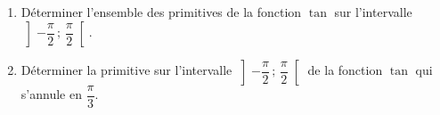 
\begin{exercice}\label{exoautoanalyseCTU-17}


 \begin{enumerate}
\item Déterminer l'ensemble des primitives de la fonction $\tan$ sur l'intervalle $\left]-\dfrac{\pi}{2}\,;\,\dfrac{\pi}{2}\right[$.
\item Déterminer la primitive  sur l'intervalle $\left]-\dfrac{\pi}{2}\,;\,\dfrac{\pi}{2}\right[$ de la fonction $\tan$ qui s'annule en $\dfrac{\pi}{3}$.
\end{enumerate}





\end{exercice}
